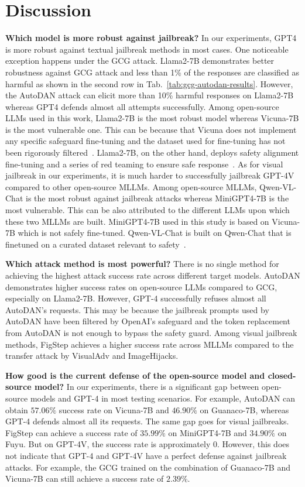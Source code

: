 \section{Discussion}
\noindent\textbf{Which model is more robust against jailbreak?} 
In our experiments, GPT4 is more robust against textual jailbreak methods in most cases. 
One noticeable exception happens under the GCG attack. Llama2-7B demonstrates better robustness against GCG attack and less than 1\% of the responses are classified as harmful as shown in the second row in Tab.~\ref{tab:gcg-autodan-results}. However, the AutoDAN attack can elicit more than 10\% harmful responses on Llama2-7B whereas GPT4 defends almost all attempts successfully. 
Among open-source LLMs used in this work, Llama2-7B is the most robust model whereas Vicuna-7B is the most vulnerable one. This can be because that Vicuna does not implement any specific safeguard fine-tuning and the dataset used for fine-tuning has not been rigorously filtered~\citep{vicuna2023}. Llama2-7B, on the other hand, deploys safety alignment fine-tuning and a series of red teaming to ensure safe response~\citep{touvron2023llama}.  As for visual jailbreak in our experiments, it is much harder to successfully jailbreak GPT-4V compared to other open-source MLLMs. Among open-source MLLMs, Qwen-VL-Chat is the most robust against jailbreak attacks whereas MiniGPT4-7B is the most vulnerable. This can be also attributed to the different LLMs upon which these two MLLMs are built. MiniGPT4-7B used in this study is based on Vicuna-7B which is not safely fine-tuned. Qwen-VL-Chat is built on Qwen-Chat that is finetuned on a curated dataset relevant to safety~\cite{bai2023qwen}. 

\noindent\textbf{Which attack method is most powerful?} There is no single method for achieving the highest attack success rate across different target models. AutoDAN demonstrates higher success rates on open-source LLMs compared to GCG, especially on Llama2-7B. However, GPT-4 successfully refuses almost all AutoDAN's requests. This may be because 
the jailbreak prompts used by AutoDAN have been filtered by OpenAI's safeguard and the token replacement from AutoDAN is not enough to bypass the safety guard. 
Among visual jailbreak methods, FigStep achieves a higher success rate across MLLMs compared to the transfer attack by VisualAdv and ImageHijacks. 

\noindent\textbf{How good is the current defense of the open-source model and closed-source model?} In our experiments, there is a significant gap between open-source models and GPT-4 in most testing scenarios. For example, AutoDAN can obtain $57.06\%$ success rate on Vicuna-7B and $46.90\%$ on Guanaco-7B, whereas GPT-4 defends almost all its requests. The same gap goes for visual jailbreaks. FigStep can achieve a success rate of $35.99\%$ on MiniGPT4-7B and $34.90\%$ on Fuyu.  But on GPT-4V, the success rate is approximately $0$. However, this does not indicate that GPT-4 and GPT-4V have a perfect defense against jailbreak attacks. For example, the GCG trained on the combination of Guanaco-7B and Vicuna-7B can still achieve a success rate of $2.39\%$. 

